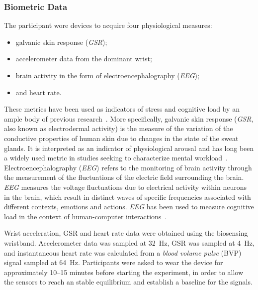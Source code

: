 \documentclass[10pt,letterpaper]{article}
\begin{document}
\subsubsection{Biometric Data}
The participant wore devices to acquire four physiological measures:

\begin{itemize}
  \item galvanic skin response (\emph{GSR});
  \item accelerometer data from the dominant wrist;
  \item brain activity in the form of electroencephalography (\emph{EEG});
  \item and heart rate.
\end{itemize}

These metrics have been used as indicators of stress and cognitive load by an ample body of previous research~\autocite{khawadi2015:usinggsrtrust,kuikkaniemi2010:biofeedback,solovey2014:classifyingdriverworkload}.
More specifically, galvanic skin response (\emph{GSR}, also known as electrodermal activity) is the measure of the variation of the conductive properties of human skin due to changes in the state of the sweat glands.
It is interpreted as an indicator of physiological arousal and has long been a widely used metric in studies seeking to characterize mental workload~\autocite{peterson1907psycho,Healey2005,Son2010,khawadi2015:usinggsrtrust,kuikkaniemi2010:biofeedback,solovey2014:classifyingdriverworkload,}.
Electroencephalography (\emph{EEG}) refers to the monitoring of brain activity through the measurement of the fluctuations of the electric field surrounding the brain.
\emph{EEG} measures the voltage fluctuations due to electrical activity within neurons in the brain, which result in distinct waves of specific frequencies associated with different contexts, emotions and actions.
\emph{EEG} has  been used to measure cognitive load in the context of human-computer interactions~\autocite{Antonenko2010,Grimes2008,kumar2016measurement}.

Wrist acceleration, GSR and heart rate data were obtained using the \textcite{empatica:e4} biosensing wristband.
Accelerometer data was sampled at \SI{32}{\hertz},
GSR was sampled at \SI{4}{\hertz}, and instantaneous heart rate was calculated from a \emph{blood volume pulse} (BVP) signal sampled at \SI{64}{\hertz}.
Participants were asked to wear the device for approximately 10--15 minutes before starting the experiment, in order to allow the sensors to reach an stable equilibrium and establish a baseline for the signals.
\end{document}
